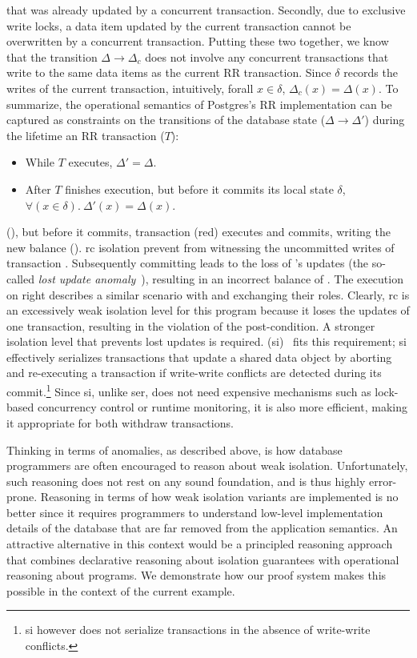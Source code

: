 that was already updated by a concurrent transaction. Secondly, due to
exclusive write locks, a data item updated by the current transaction
cannot be overwritten by a concurrent transaction. Putting these two
together, we know that the transition $\Delta \longrightarrow
\Delta_c$ does not involve any concurrent transactions that write to
the same data items as the current RR transaction. Since $\delta$
records the writes of the current transaction, intuitively, forall
$x\in\delta$, $\Delta_c(x) = \Delta(x)$. To summarize, the operational
semantics of Postgres's RR implementation can be captured as
constraints on the transitions of the database state ($\Delta
\longrightarrow \Delta'$) during the lifetime an RR
transaction ($T$):
\begin{itemize}
  \item While $T$ executes, $\Delta' = \Delta$.
  \item After $T$ finishes execution, but before it commits its local
    state $\delta$, $\forall(x\in\delta).~\Delta'(x) = \Delta(x)$.
\end{itemize}




\newpage

(), but before it commits, transaction  (red) executes
and commits, writing the new balance (). {\sc rc} isolation
prevent  from witnessing the uncommitted writes of transaction
.  Subsequently committing  leads to the loss of
's updates (the so-called \emph{lost update
anomaly}~\cite{berenson}), resulting in an incorrect balance of
. The execution on right describes a similar scenario with
 and  exchanging their roles.  Clearly, {\sc rc} is an
excessively weak isolation level for this program because it loses the
updates of one transaction, resulting in the violation of the
post-condition.  A stronger isolation level that prevents lost updates
is required.  ({\sc si})~\cite{berenson} fits
this requirement; {\sc si} effectively serializes transactions that
update a shared data object by aborting and re-executing a transaction
if write-write conflicts are detected during its commit.\footnote{{\sc
si} however does not serialize transactions in the absence of
write-write conflicts.} Since {\sc si}, unlike {\sc ser}, does not
need expensive mechanisms such as lock-based concurrency control or
runtime monitoring, it is also more efficient, making it appropriate
for both withdraw transactions.

Thinking in terms of anomalies, as described above, is how database
programmers are often encouraged to reason about weak isolation.
Unfortunately, such reasoning does not rest on any sound foundation,
and is thus highly error-prone. Reasoning in terms of how weak
isolation variants are implemented is no better since it requires
programmers to understand low-level implementation details of the
database that are far removed from the application semantics. An
attractive  alternative in this context would be a principled
reasoning approach that combines declarative reasoning about isolation
guarantees with operational reasoning about programs. We demonstrate
how our proof system makes this possible in the context of the current
example.

